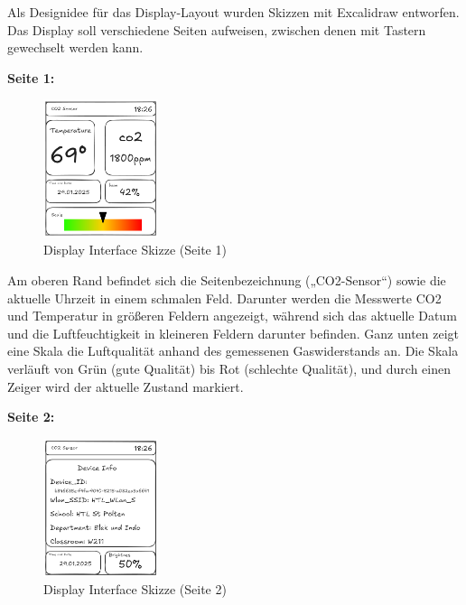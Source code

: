 \begin{inhalt}
Als Designidee für das Display-Layout wurden Skizzen mit Excalidraw \cite{Excalidraw} entworfen. Das Display soll verschiedene Seiten aufweisen, zwischen denen mit Tastern gewechselt werden kann. 

\smallskip

\begin{center}
    \textbf{Seite 1:}
\end{center}

\begin{figure}[!htb]
\centering
\includegraphics[width=0.3\textwidth]{files/Tobias/pics/Skizzen/Screen1_Sensor_Info.png}
\caption[Display Interface Skizze (Seite 1)]{Display Interface Skizze (Seite 1)}
\label{fig:display_skizze_seite_1}
\end{figure}

Am oberen Rand befindet sich die Seitenbezeichnung („CO2-Sensor“) sowie die aktuelle Uhrzeit in einem schmalen Feld. Darunter werden die Messwerte CO2 und Temperatur in größeren Feldern angezeigt, während sich das aktuelle Datum und die Luftfeuchtigkeit in kleineren Feldern darunter befinden. Ganz unten zeigt eine Skala die Luftqualität anhand des gemessenen Gaswiderstands an. Die Skala verläuft von Grün (gute Qualität) bis Rot (schlechte Qualität), und durch einen Zeiger wird der aktuelle Zustand markiert.

\begin{center}
    \textbf{Seite 2:}
\end{center}

\begin{figure}[!htb]
\centering
\includegraphics[width=0.3\textwidth]{files/Tobias/pics/Skizzen/Screen2_Info.png}
\caption[Display Interface Skizze (Seite 2)]{Display Interface Skizze (Seite 2)}
\label{fig:display_skizze_seite_2}
\end{figure}


\end{inhalt}
